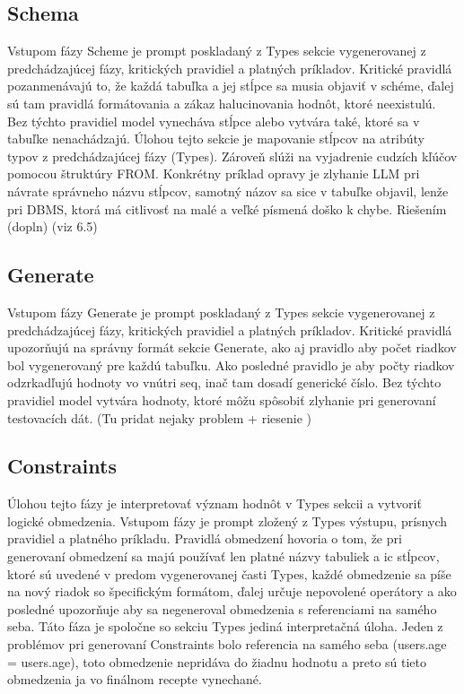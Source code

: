 \subsection{Schema}
Vstupom fázy Scheme je prompt poskladaný z Types sekcie vygenerovanej z predchádzajúcej fázy, kritických pravidiel a platných príkladov. Kritické pravidlá pozanmenávajú to, že každá tabuľka a jej stĺpce sa musia objaviť v schéme, ďalej sú tam pravidlá formátovania a zákaz halucinovania hodnôt, ktoré neexistulú. Bez týchto pravidiel model vynecháva stĺpce alebo vytvára také, ktoré sa v tabuľke nenachádzajú. Úlohou tejto sekcie je mapovanie stĺpcov na atribúty typov z predchádzajúcej fázy (Types). Zároveň slúži na vyjadrenie cudzích kľúčov pomocou štruktúry FROM. Konkrétny príklad opravy je zlyhanie LLM pri návrate správneho názvu stĺpcov, samotný názov sa sice v tabuľke objavil, lenže pri DBMS, ktorá má citlivosť na malé a veľké písmená doško k chybe. Riešením (dopln) (viz 6.5)

\subsection{Generate}
Vstupom fázy Generate je prompt poskladaný z Types sekcie vygenerovanej z predchádzajúcej fázy, kritických pravidiel a platných príkladov. Kritické pravidlá upozorňujú na správny formát sekcie Generate, ako aj pravidlo aby počet riadkov bol vygenerovaný pre každú tabuľku. Ako posledné pravidlo je aby počty riadkov odzrkadľujú hodnoty vo vnútri seq, inač tam dosadí generické číslo. Bez týchto pravidiel model vytvára hodnoty, ktoré môžu spôsobiť zlyhanie pri generovaní testovacích dát. (Tu pridat nejaky problem + riesenie )

\subsection{Constraints}
Úlohou tejto fázy je interpretovať význam hodnôt v Types sekcii a vytvoriť logické obmedzenia. Vstupom fázy je prompt zložený z Types výstupu, prísnych pravidiel a platného príkladu. Pravidlá obmedzení hovoria o tom, že pri generovaní obmedzení sa majú používať len platné názvy tabuliek a ic stĺpcov, ktoré sú uvedené v predom vygenerovanej časti Types, každé obmedzenie sa píše na nový riadok so špecifickým formátom, ďalej určuje nepovolené operátory a ako posledné upozorňuje aby sa negeneroval obmedzenia s referenciami na samého seba. Táto fáza je spoločne so sekciu Types jediná interpretačná úloha. Jeden z problémov pri generovaní Constraints bolo referencia na samého seba (users.age = users.age), toto obmedzenie nepridáva do žiadnu hodnotu a preto sú tieto obmedzenia ja vo finálnom recepte vynechané.


